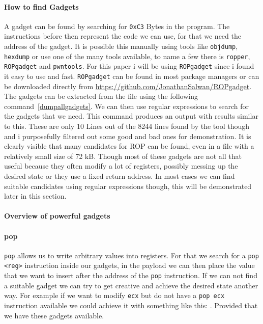 \documentclass[journal=tosc,submission, notanonymous]{iacrtrans}
\begin{document}
\paragraph{How to find Gadgets}
\label{par:ropgadget}
A gadget can be found by searching for \Verb+0xC3+ Bytes in the program. The instructions before then represent the code we can use, for that we need the address of the gadget. It is possible this manually using tools like \Verb+objdump+, \Verb+hexdump+ or use one of the many tools available, to name a few there is \Verb+ropper+, \Verb+ROPgadget+ and \Verb+pwntools+. For this paper i will be using \Verb+ROPgadget+ since i found it easy to use and fast. \Verb+ROPgadget+ can be found in most package managers or can be downloaded directly from \url{https://github.com/JonathanSalwan/ROPgadget}. The gadgets can be extracted from the file using the following command~\cref{dumpallgadgets}. We can then use regular expressions to search for the gadgets that we need.
This command produces an output with results similar to this.
These are only 10 Lines out of the 8244 lines found by the tool though and i purposefully filtered out some good and bad ones for demonstration. It is clearly visible that many candidates for ROP can be found, even in a file with a relatively small size of 72 kB. Though most of these gadgets are not all that useful because they often modify a lot of registers, possibly messing up the desired state or they use a fixed return address. In most cases we can find suitable candidates using regular expressions though, this will be demonstrated later in this section.
\paragraph{Overview of powerful gadgets}
\paragraph{pop}
\Verb+pop+ allows us to write arbitrary values into registers. For that we search for a \Verb+pop <reg>+ instruction inside our gadgets, in the payload we can then place the value that we want to insert after the address of the \Verb+pop+ instruction. If we can not find a suitable gadget we can try to get creative and achieve the desired state another way. For example if we want to modify \Verb+ecx+ but do not have a \Verb+pop ecx+ instruction available we could achieve it with something like this: . Provided that we have these gadgets available.
\end{document}
